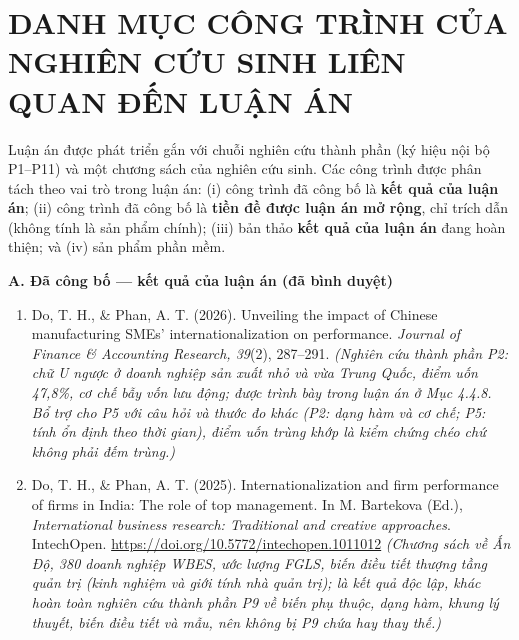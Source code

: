 \documentclass[
  a4paper,
  13pt]{extreport}
\providecommand{\tightlist}{%
  \setlength{\itemsep}{0pt}\setlength{\parskip}{0pt}}
\begin{document}
\hypertarget{danh-mux1ee5c-cuxf4ng-truxecnh-cux1ee7a-nghiuxean-cux1ee9u-sinh-liuxean-quan-ux111ux1ebfn-luux1eadn-uxe1n}{%
\section*{DANH MỤC CÔNG TRÌNH CỦA NGHIÊN CỨU SINH LIÊN QUAN ĐẾN LUẬN
ÁN}\label{danh-mux1ee5c-cuxf4ng-truxecnh-cux1ee7a-nghiuxean-cux1ee9u-sinh-liuxean-quan-ux111ux1ebfn-luux1eadn-uxe1n}}

Luận án được phát triển gắn với chuỗi nghiên cứu thành phần (ký hiệu nội
bộ P1--P11) và một chương sách của nghiên cứu sinh. Các công trình được
phân tách theo vai trò trong luận án: (i) công trình đã công bố là
\textbf{kết quả của luận án}; (ii) công trình đã công bố là \textbf{tiền
đề được luận án mở rộng}, chỉ trích dẫn (không tính là sản phẩm chính);
(iii) bản thảo \textbf{kết quả của luận án} đang hoàn thiện; và (iv) sản
phẩm phần mềm.

\textbf{A. Đã công bố --- kết quả của luận án (đã bình duyệt)}

\begin{enumerate}
\def\labelenumi{\arabic{enumi}.}
\tightlist
\item
  Do, T. H., \& Phan, A. T. (2026). Unveiling the impact of Chinese
  manufacturing SMEs' internationalization on performance. \emph{Journal
  of Finance \& Accounting Research, 39}(2), 287--291. \emph{(Nghiên cứu
  thành phần P2: chữ U ngược ở doanh nghiệp sản xuất nhỏ và vừa Trung
  Quốc, điểm uốn 47,8\%, cơ chế bẫy vốn lưu động; được trình bày trong
  luận án ở Mục 4.4.8. Bổ trợ cho P5 với câu hỏi và thước đo khác (P2:
  dạng hàm và cơ chế; P5: tính ổn định theo thời gian), điểm uốn trùng
  khớp là kiểm chứng chéo chứ không phải đếm trùng.)}
\item
  Do, T. H., \& Phan, A. T. (2025). Internationalization and firm
  performance of firms in India: The role of top management. In M.
  Bartekova (Ed.), \emph{International business research: Traditional
  and creative approaches}. IntechOpen.
  \url{https://doi.org/10.5772/intechopen.1011012} \emph{(Chương sách về
  Ấn Độ, 380 doanh nghiệp WBES, ước lượng FGLS, biến điều tiết thượng
  tầng quản trị (kinh nghiệm và giới tính nhà quản trị); là kết quả độc
  lập, khác hoàn toàn nghiên cứu thành phần P9 về biến phụ thuộc, dạng
  hàm, khung lý thuyết, biến điều tiết và mẫu, nên không bị P9 chứa hay
  thay thế.)}
\end{enumerate}
\end{document}

